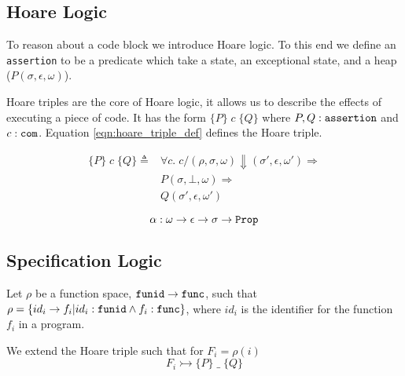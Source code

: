 \subsection{Hoare Logic}


To reason about a code block we introduce Hoare logic. To this end we define an \verb|assertion| to be a predicate which take a state, an exceptional state, and a heap ($P(\sigma,\epsilon,\omega)$).

Hoare triples are the core of Hoare logic, it allows us to describe the effects of executing a piece of code. It has the form $\{P\}\;c\;\{Q\}$ where $P,Q : \verb|assertion|$ and $c : \verb|com|$.
Equation \ref{eqn:hoare_triple_def} defines the Hoare triple.

\begin{equation}\label{eqn:hoare_triple_def}
\begin{split}
\{P\}\;c\;\{Q\} \triangleq
& \forall c.\; c / (\rho,\sigma,\omega) \Downarrow (\sigma', \epsilon, \omega') \Rightarrow\\
& P(\sigma,\bot,\omega) \Rightarrow\\
& Q(\sigma',\epsilon,\omega')
\end{split}
\end{equation}

\begin{equation}\label{eqn:alpha-type}
\alpha: \omega \rightarrow \epsilon \rightarrow \sigma \rightarrow \verb|Prop|
\end{equation}


\subsection{Specification Logic}
Let $\rho$ be a function space, 
$\verb|funid| \rightarrow \verb|func|$, 
such that 
$\rho = \{ id_i \rightarrow f_i | id_i : \verb|funid| \wedge f_i:\verb|func| \}$, 
where $id_i$ is the identifier for the function $f_i$ in a program.

We extend the Hoare triple such that for $F_i = \rho(i)$
\begin{equation}
F_i \rightarrowtail \{P\}\;\_\;\{Q\}
\end{equation}
